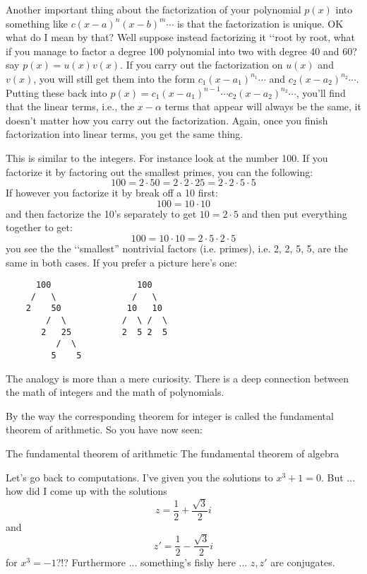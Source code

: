 Another important thing about the factorization of your polynomial $p(x)$ into
something like $c(x-a)^n(x-b)^m \cdots$ is that the factorization is unique.
OK what do I mean by that?
Well suppose instead factorizing it \lq\lq root by root, what if you 
manage to factor a degree 100 polynomial into two with degree 40 and 60?
say $p(x) = u(x) v(x)$.
If you carry out the factorization on $u(x)$ and $v(x)$, you will
still get them into the form $c_1(x-a_1)^{n_1} \cdots$ and $c_2(x-a_2)^{n_2} \cdots$.
Putting these back into $p(x) = c_1(x-a_1)^{n-1} \cdots c_2(x-a_2)^{n_2} \cdots$,
you'll find that the linear terms, i.e., the $x-\alpha$ terms that appear will always
be the same, it doesn't matter how you carry out the factorization.
Again, once you finish factorization into linear terms, you get the same thing.

This is similar to the integers.
For instance look at the number 100.
If you factorize it by factoring out the smallest primes, you can
the following:
\[
100 = 2 \cdot 50 = 2 \cdot 2 \cdot 25 = 2 \cdot 2 \cdot 5 \cdot 5
\]
If however you factorize it by break off a 10 first:
\[
100 = 10 \cdot 10
\]
and then factorize the 10's separately to get $10 = 2 \cdot 5$ and then 
put everything together to get:
\[
100 = 10 \cdot 10 = 2 \cdot 5 \cdot 2 \cdot 5
\]
you see the the \lq\lq smallest'' nontrivial factors
(i.e. primes), i.e. 2, 2, 5, 5, are the same
in both cases.
If you prefer a picture here's one:
\begin{verbatim}
      100                 100
     /   \               /   \
    2    50             10   10
        /  \           /  \ /  \
       2   25          2  5 2  5
          /  \
         5    5
\end{verbatim}

The analogy is more than a mere curiosity. 
There is a deep connection between the math of integers and the
math of polynomials.

By the way the corresponding theorem for integer is called
the fundamental theorem of arithmetic.
So you have now seen:
\begin{enumerate}[nosep]
\li The fundamental theorem of arithmetic
\li The fundamental theorem of algebra
\end{enumerate}

Let's go back to computations.
I've given you the solutions to $x^3 + 1 = 0$.
But ...
how did I come up with the solutions
\[
z = \frac{1}{2} + \frac{\sqrt{3}}{2}i
\]
and
\[
z' = \frac{1}{2} - \frac{\sqrt{3}}{2}i
\] 
for $x^3 = -1$?!?
Furthermore ... something's fishy here ...
$z,z'$ are conjugates.

